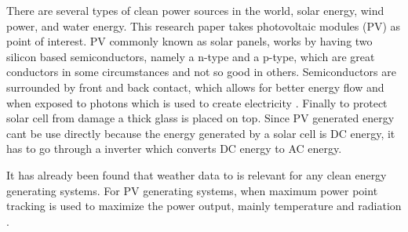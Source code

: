 There are several types of clean power sources in the world, solar energy, wind power, and water energy.
 This research paper takes photovoltaic modules (PV) as point of interest. PV commonly known as solar panels, works by
having two silicon based semiconductors, namely a n-type and a p-type, which are great conductors in some circumstances and not so good in others. Semiconductors are surrounded by front and back contact, which allows for better energy flow and when exposed to photons which is used to
create electricity \citep{photovoltaic}. Finally to protect solar cell from damage a thick glass is placed on top. Since PV generated energy cant be use directly because the energy generated by a solar cell is DC energy, it has to go through a inverter which converts DC energy to AC energy.

It has already been found that weather data to is relevant for any clean energy generating systems. For PV
generating systems, when maximum power point tracking is used to
maximize the power output, mainly temperature and radiation \citep{mppt2004}.



